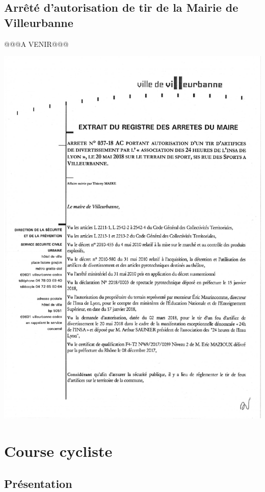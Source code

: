 \documentclass[hidelinks, paper=a4, fontsize=13pt]{report}
\begin{document}
\subsection{Arrêté d’autorisation de tir de la Mairie de Villeurbanne}
@@@A VENIR@@@
\begin{center}
\includegraphics[scale=0.7]{Annexes/Documents/Villeurbannefeud'artifice}
\end{center}


\newpage
\section{Course cycliste}

\subsection{Présentation}
\end{document}

